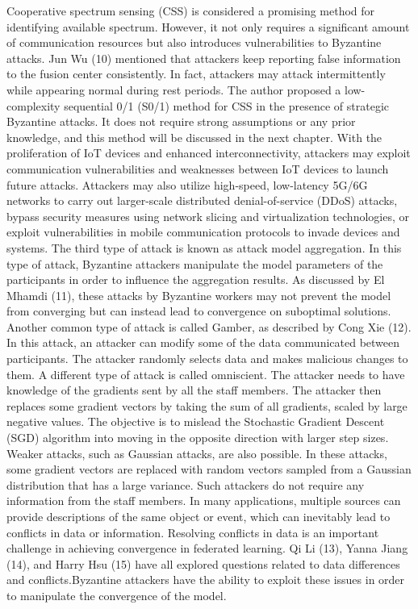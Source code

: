 \documentclass[conference]{IEEEtran}
\begin{document}
Cooperative spectrum sensing (CSS) is considered a promising method for identifying available spectrum. However, it not only requires a significant amount of communication resources but also introduces vulnerabilities to Byzantine attacks. Jun Wu (10) mentioned that attackers keep reporting false information to the fusion center consistently. In fact, attackers may attack intermittently while appearing normal during rest periods. The author proposed a low-complexity sequential 0/1 (S0/1) method for CSS in the presence of strategic Byzantine attacks. It does not require strong assumptions or any prior knowledge, and this method will be discussed in the next chapter.
With the proliferation of IoT devices and enhanced interconnectivity, attackers may exploit communication vulnerabilities and weaknesses between IoT devices to launch future attacks. Attackers may also utilize high-speed, low-latency 5G/6G networks to carry out larger-scale distributed denial-of-service (DDoS) attacks, bypass security measures using network slicing and virtualization technologies, or exploit vulnerabilities in mobile communication protocols to invade devices and systems.
The third type of attack is known as attack model aggregation. In this type of attack, Byzantine attackers manipulate the model parameters of the participants in order to influence the aggregation results. As discussed by El Mhamdi (11), these attacks by Byzantine workers may not prevent the model from converging but can instead lead to convergence on suboptimal solutions.
Another common type of attack is called Gamber, as described by Cong Xie (12). In this attack, an attacker can modify some of the data communicated between participants. The attacker randomly selects data and makes malicious changes to them.
A different type of attack is called omniscient. The attacker needs to have knowledge of the gradients sent by all the staff members. The attacker then replaces some gradient vectors by taking the sum of all gradients, scaled by large negative values. The objective is to mislead the Stochastic Gradient Descent (SGD) algorithm into moving in the opposite direction with larger step sizes.
Weaker attacks, such as Gaussian attacks, are also possible. In these attacks, some gradient vectors are replaced with random vectors sampled from a Gaussian distribution that has a large variance. Such attackers do not require any information from the staff members.
In many applications, multiple sources can provide descriptions of the same object or event, which can inevitably lead to conflicts in data or information. Resolving conflicts in data is an important challenge in achieving convergence in federated learning. Qi Li (13), Yanna Jiang (14), and Harry Hsu (15) have all explored questions related to data differences and conflicts.Byzantine attackers have the ability to exploit these issues in order to manipulate the convergence of the model.
\end{document}
